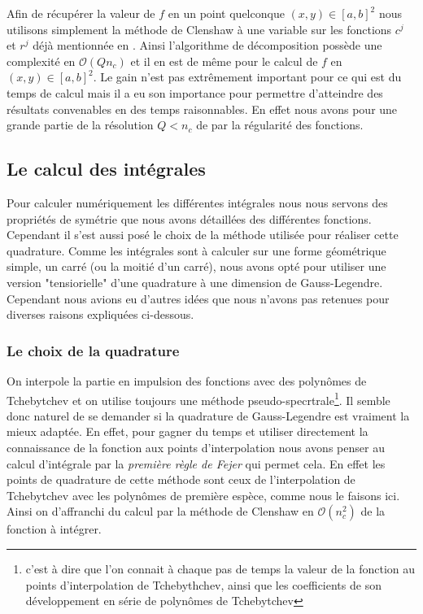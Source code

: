 \documentclass[10pt]{article}
\begin{document}
\begin{multicols}{2}
Afin de récupérer la valeur de $f$ en un point quelconque $(x,y) \in [a,b]^2 $ nous utilisons simplement la méthode de Clenshaw à une variable sur les fonctions $c^j$ et $r^j$ déjà mentionnée en . Ainsi l'algorithme de décomposition possède une complexité en $\mathcal{O}(Q n_c)$ et il en est de même pour le calcul de $f$ en $(x,y) \in [a,b]^2$. Le gain n'est pas extrêmement important pour ce qui est du temps de calcul mais il a eu son importance pour permettre d'atteindre des résultats convenables en des temps raisonnables. En effet nous avons pour une grande partie de la résolution $Q < n_c$ de par la régularité des fonctions. \\



\subsection{Le calcul des intégrales} 

Pour calculer numériquement les différentes intégrales nous nous servons des propriétés de symétrie que nous avons détaillées des différentes fonctions. Cependant il s'est aussi posé le choix de la méthode utilisée pour réaliser cette quadrature. Comme les intégrales sont à calculer sur une forme géométrique simple, un carré (ou la moitié d'un carré), nous avons opté pour utiliser une version "tensiorielle" d'une quadrature à une dimension de Gauss-Legendre. Cependant nous avions eu d'autres idées que nous n'avons pas retenues pour diverses raisons expliquées ci-dessous.


\subsubsection{Le choix de la quadrature}

On interpole la partie en impulsion des fonctions avec des polynômes de Tchebytchev et on utilise toujours une méthode pseudo-specrtrale\footnote{c'est à dire que l'on connait à chaque pas de temps la valeur de la fonction au points d'interpolation de Tchebythchev, ainsi que les coefficients de son développement en série de polynômes de Tchebytchev}. Il semble donc naturel de se demander si la quadrature de Gauss-Legendre est vraiment la mieux adaptée. En effet, pour gagner du temps et utiliser directement la connaissance de la fonction aux points d'interpolation nous avons penser au calcul d'intégrale par la \emph{première règle de Fejer} \cite{} qui permet cela. En effet les points de quadrature de cette méthode sont ceux de l'interpolation de Tchebytchev avec les polynômes de première espèce, comme nous le faisons ici. Ainsi on d'affranchi du calcul par la méthode de Clenshaw en $\mathcal{O}(n_c^2)$ de la fonction à intégrer. 
 

\end{multicols}
\end{document}
